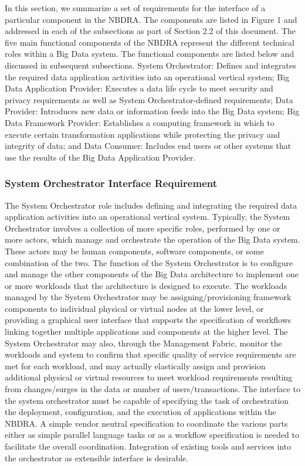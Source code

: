 \documentclass[10pt]{article}
\begin{document}
In this section, we summarize a set of requirements for the interface of a particular component in the NBDRA. The components are listed in Figure 1 and addressed in each of the subsections as part of Section 2.2 of this document. The five main functional components of the NBDRA represent the different technical roles within a Big Data system. The functional components are listed below and discussed in subsequent subsections.
System Orchestrator: Defines and integrates the required data application activities into an operational vertical system;
Big Data Application Provider: Executes a data life cycle to meet security and privacy requirements as well as System Orchestrator-defined requirements;
Data Provider: Introduces new data or information feeds into the Big Data system;
Big Data Framework Provider: Establishes a computing framework in which to execute certain transformation applications while protecting the privacy and integrity of data; and
Data Consumer: Includes end users or other systems that use the results of the Big Data Application Provider.

\subsubsection{System Orchestrator Interface Requirement}

The System Orchestrator role includes defining and integrating the required data application activities into an operational vertical system. Typically, the System Orchestrator involves a collection of more specific roles, performed by one or more actors, which manage and orchestrate the operation of the Big Data system. These actors may be human components, software components, or some combination of the two. The function of the System Orchestrator is to configure and manage the other components of the Big Data architecture to implement one or more workloads that the architecture is designed to execute. The workloads managed by the System Orchestrator may be assigning/provisioning framework components to individual physical or virtual nodes at the lower level, or providing a graphical user interface that supports the specification of workflows linking together multiple applications and components at the higher level. The System Orchestrator may also, through the Management Fabric, monitor the workloads and system to confirm that specific quality of service requirements are met for each workload, and may actually elastically assign and provision additional physical or virtual resources to meet workload requirements resulting from changes/surges in the data or number of users/transactions.
The interface to the system orchestrator must be capable of specifying the task of orchestration the deployment, configuration, and the execution of applications within the NBDRA. A simple vendor neutral specification to coordinate the various parts either as simple parallel language tasks or as a workflow specification is needed to facilitate the overall coordination. Integration of existing tools and services into the orchestrator as extensible interface is desirable.
\end{document}

